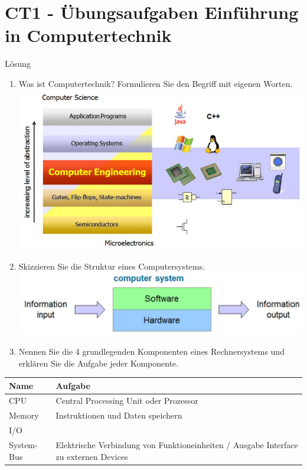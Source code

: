 \documentclass[10pt]{article}
\begin{document}
\section*{CT1 - Übungsaufgaben Einführung in Computertechnik}
Lösung

\begin{enumerate}
  \item Was ist Computertechnik? Formulieren Sie den Begriff mit eigenen Worten.\\
\includegraphics[width=\linewidth]{images/2025_01_02_f240dc33b50f25226887g-1(1)}
  \item Skizzieren Sie die Struktur eines Computersystems.\\
\includegraphics[width=\linewidth]{images/2025_01_02_f240dc33b50f25226887g-1}
  \item Nennen Sie die 4 grundlegenden Komponenten eines Rechnersystems und erklären Sie die Aufgabe jeder Komponente.
\end{enumerate}

\begin{center}
\begin{tabular}{|l|l|}
\hline
Name & Aufgabe \\
\hline
CPU & Central Processing Unit oder Prozessor \\
\hline
Memory & Instruktionen und Daten speichern \\
\hline
I/O &  \\
\hline
System-Bus & Elektrische Verbindung von Funktioneinheiten / Ausgabe Interface zu externen Devices \\
\hline
\end{tabular}
\end{center}
\end{document}
